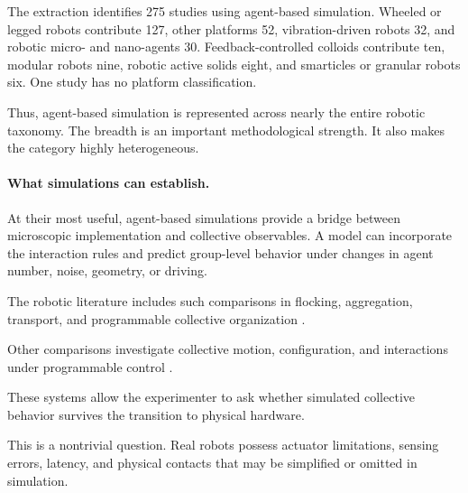 The extraction identifies 275 studies
using agent-based simulation.
Wheeled or legged robots contribute 127,
other platforms 52,
vibration-driven robots 32,
and robotic micro- and nano-agents 30.
Feedback-controlled colloids contribute ten,
modular robots nine,
robotic active solids eight,
and smarticles or granular robots six.
One study has no platform classification.

Thus, agent-based simulation is represented
across nearly the entire robotic taxonomy.
The breadth is an important methodological
strength. It also makes the category
highly heterogeneous.

\paragraph*{What simulations can establish.}\hfill\break %
At their most useful, agent-based simulations
provide a bridge between microscopic
implementation and collective observables.
A model can incorporate the interaction
rules and predict group-level behavior
under changes in agent number,
noise, geometry, or driving.

The robotic literature includes
such comparisons in flocking,
aggregation, transport,
and programmable collective
organization
\cite{Turgut2008modelingphasetrans,Navarro2008anapproachtoflock,Garnier2005aggregationbehaviou,Guzzi2014bioinspiredobstacle,Cazenille2016automatedoptimisati,Vsrhelyi2018optimizedflockingo,Ferrante2012selforganizedflock,Mijalkov2016engineeringsensoria,Berlinger2021selforganizedevasi,Fruchart2022nonreciprocalphase,Zhou2024anticipationpromote,Barone2024experimentalandnum,Paramanick2025spontaneousemergenc,Zhang2026emergentnonhermiti}.

Other comparisons investigate
collective motion,
configuration,
and interactions
under programmable control
\cite{Yamada2011circularmotiongene,Yang2023collectivechaseem,Tran2022frontierledswarmin,Giardina2022collectivephototact,Vega2023simulatelessexpec,Vega2023indirectswarmcontr,Vega2024agentbasedemulatio,Gao2023robustdistributedc,Lee2022distributedcohesive,Baumann2024hybridflockforma,Wu2024adversarialimitatio,Varadharajan2026programmableflocks,Pan2026exploringthephysic,Sankar2026trendformationwith,Verdoucq2025flockingphasetrans,Jond2026positionbasedflock}.

These systems allow the
experimenter to ask
whether simulated
collective behavior
survives the transition
to physical hardware.

This is a nontrivial
question. Real robots
possess actuator
limitations, sensing
errors, latency,
and physical contacts
that may be simplified
or omitted in simulation.

